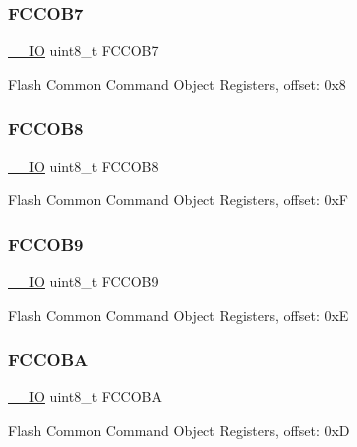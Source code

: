 \subsubsection{\texorpdfstring{FCCOB7}{FCCOB7}}
{\footnotesize\ttfamily \mbox{\hyperlink{core__cm0plus_8h_aec43007d9998a0a0e01faede4133d6be}{\+\_\+\+\_\+\+IO}} uint8\+\_\+t F\+C\+C\+O\+B7}

Flash Common Command Object Registers, offset\+: 0x8 \mbox{\label{struct_f_t_f_a___type_a02485b6c951602d1fc7bc5c4ffc13994}} 
\subsubsection{\texorpdfstring{FCCOB8}{FCCOB8}}
{\footnotesize\ttfamily \mbox{\hyperlink{core__cm0plus_8h_aec43007d9998a0a0e01faede4133d6be}{\+\_\+\+\_\+\+IO}} uint8\+\_\+t F\+C\+C\+O\+B8}

Flash Common Command Object Registers, offset\+: 0xF \mbox{\label{struct_f_t_f_a___type_adfbc3fe490e0f3d6d67facdc8e0d3497}} 
\subsubsection{\texorpdfstring{FCCOB9}{FCCOB9}}
{\footnotesize\ttfamily \mbox{\hyperlink{core__cm0plus_8h_aec43007d9998a0a0e01faede4133d6be}{\+\_\+\+\_\+\+IO}} uint8\+\_\+t F\+C\+C\+O\+B9}

Flash Common Command Object Registers, offset\+: 0xE \mbox{\label{struct_f_t_f_a___type_a1b1815ddd62683aeabdeac281ff2b4e9}} 
\subsubsection{\texorpdfstring{FCCOBA}{FCCOBA}}
{\footnotesize\ttfamily \mbox{\hyperlink{core__cm0plus_8h_aec43007d9998a0a0e01faede4133d6be}{\+\_\+\+\_\+\+IO}} uint8\+\_\+t F\+C\+C\+O\+BA}

Flash Common Command Object Registers, offset\+: 0xD \mbox{\label{struct_f_t_f_a___type_a547577f975c70d66760366cc120462b0}} 
